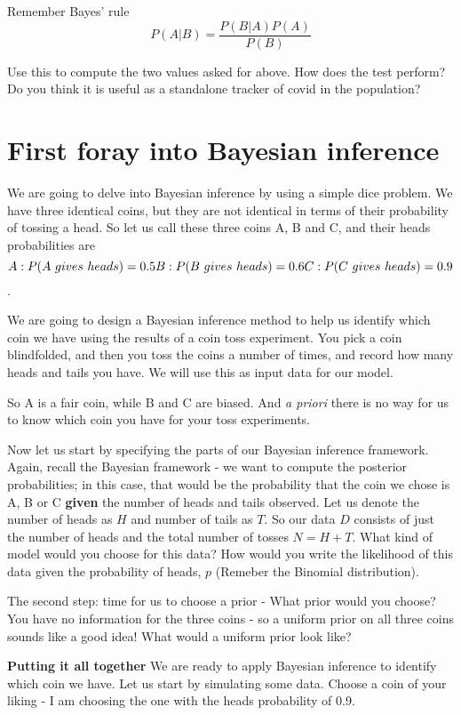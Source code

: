 \documentclass[
]{book}
\begin{document}
Remember Bayes' rule \[P(A|B) = \frac{P(B|A)P(A)}{P(B)}\]

Use this to compute the two values asked for above. How does the test perform? Do you think it is useful as a standalone tracker of covid in the population?

\hypertarget{first-foray-into-bayesian-inference}{%
\section{First foray into Bayesian inference}\label{first-foray-into-bayesian-inference}}

We are going to delve into Bayesian inference by using a simple dice problem. We have three identical coins, but they are not identical in terms of their probability of tossing a head. So let us call these three coins A, B and C, and their heads probabilities are \[A: P(A~gives~heads) = 0.5 \\B: P(B~gives~heads) =  0.6 \\ C: P(C~gives~heads) = 0.9\].

We are going to design a Bayesian inference method to help us identify which coin we have using the results of a coin toss experiment. You pick a coin blindfolded, and then you toss the coins a number of times, and record how many heads and tails you have. We will use this as input data for our model.

So A is a fair coin, while B and C are biased. And \emph{a priori} there is no way for us to know which coin you have for your toss experiments.

Now let us start by specifying the parts of our Bayesian inference framework. Again, recall the Bayesian framework - we want to compute the posterior probabilities; in this case, that would be the probability that the coin we chose is A, B or C \textbf{given} the number of heads and tails observed. Let us denote the number of heads as \(H\) and number of tails as \(T\). So our data \(D\) consists of just the number of heads and the total number of tosses \(N = H+T\). What kind of model would you choose for this data? How would you write the likelihood of this data given the probability of heads, \(p\) (Remeber the Binomial distribution).

The second step: time for us to choose a prior - What prior would you choose? You have no information for the three coins - so a uniform prior on all three coins sounds like a good idea! What would a uniform prior look like?

\textbf{Putting it all together}
We are ready to apply Bayesian inference to identify which coin we have. Let us start by simulating some data. Choose a coin of your liking - I am choosing the one with the heads probability of 0.9.
\end{document}
